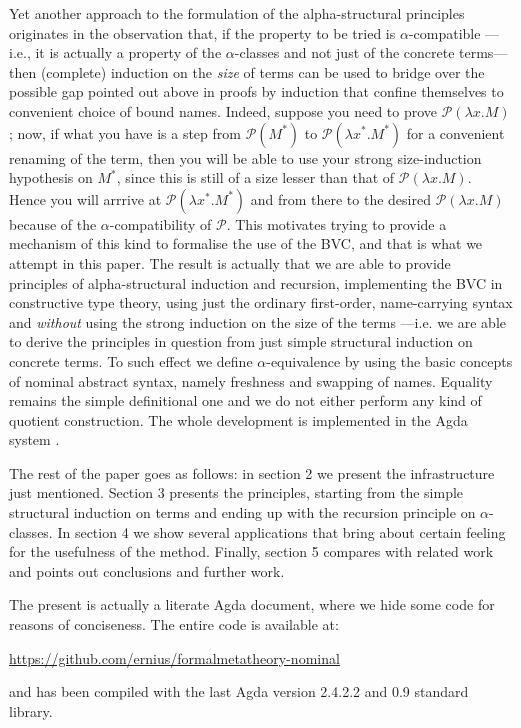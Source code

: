\documentclass{entcs}
\begin{document}
Yet another approach to the formulation of the alpha-structural principles originates in the observation that, if the property to be tried is $\alpha$-compatible ---i.e., it is actually a property of the $\alpha$-classes and not just of the concrete terms--- then (complete) induction on the \emph{size} of terms can be used to bridge over the possible gap pointed out above in proofs by induction that confine themselves to convenient choice of bound names. 
Indeed, suppose you need to prove $\mathcal{P}(\lambda x.M)$; now, if what you have is a step from $\mathcal{P}(M^{*})$ to $\mathcal{P}(\lambda x^{*}.M^{*})$ for a convenient renaming of the term, then you will be able to use your strong size-induction hypothesis on $M^{*}$, since this is still of a size lesser than that of $\mathcal{P}(\lambda x.M)$. Hence you will arrrive at $\mathcal{P}(\lambda x^{*}.M^{*})$ and from there to the desired $\mathcal{P}(\lambda x.M)$ because of the $\alpha$-compatibility of $\mathcal{P}$.
This motivates trying to provide a mechanism of this kind to formalise the use of the BVC, and that is what we attempt in this paper. The result is actually that we are able to provide principles of alpha-structural induction and recursion, implementing the BVC in constructive type theory, using just the ordinary first-order, name-carrying syntax and \emph{without} using the strong induction on the size of the terms ---i.e. we are able to derive the principles in question from just simple structural induction on concrete terms. To such effect we define $\alpha$-equivalence by using the basic concepts of nominal abstract syntax, namely freshness and swapping of names. Equality remains the simple definitional one and we do not either perform any kind of quotient construction. The whole development is implemented in the Agda system \cite{agda}.

The rest of the paper goes as follows: in section 2 we present the infrastructure just mentioned. Section 3 presents the principles, starting from the simple structural induction on terms and ending up with the recursion principle on $\alpha$-classes. In section 4 we show several applications that bring about certain feeling for the usefulness of the method. Finally, section 5 compares with related work and points out conclusions and further work.

The present is actually a literate Agda document, where we hide some code for reasons of conciseness.  The entire code is available at:
\begin{center}
  \href{https://github.com/ernius/formalmetatheory-nominal}{https://github.com/ernius/formalmetatheory-nominal}
\end{center}
and has been compiled with the last Agda version 2.4.2.2 and 0.9 standard library.
\end{document}
